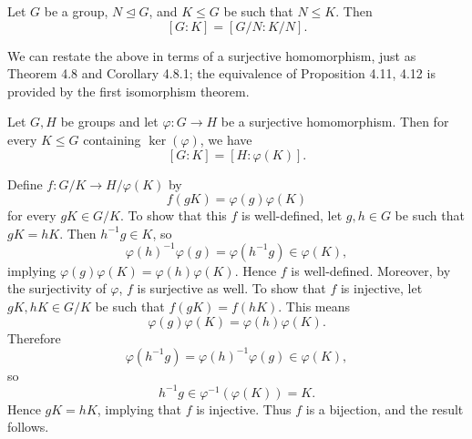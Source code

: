 \documentclass[pmath347]{subfiles}
\begin{document}
    \begin{prop}{}
        Let $G$ be a group, $N\trianglelefteq G$, and $K\leq G$ be such that $N\leq K$. Then
        \begin{equation*}
            \left[ G:K \right] = \left[ G /N:K /N \right] .
        \end{equation*}
    \end{prop}

    \noindent We can restate the above in terms of a surjective homomorphism, just as Theorem 4.8 and Corollary 4.8.1; the equivalence of Proposition 4.11, 4.12 is provided by the first isomorphism theorem.

    \begin{prop}{}
        Let $G,H$ be groups and let $\varphi:G\to H$ be a surjective homomorphism. Then for every $K\leq G$ containing $\ker\left( \varphi \right)$, we have
        \begin{equation*}
            \left[ G:K \right] = \left[ H:\varphi\left( K \right)  \right] .
        \end{equation*}
    \end{prop}

    \begin{prop}{}
        Define $f:G /K\to H /\varphi\left( K \right)$ by
        \begin{equation*}
            f\left( gK \right) = \varphi\left( g \right) \varphi\left( K \right) 
        \end{equation*}
        for every $gK\in G /K$. To show that this $f$ is well-defined, let $g,h\in G$ be such that $gK=hK$. Then $h^{-1} g \in K$, so
        \begin{equation*}
            \varphi\left( h \right) ^{-1} \varphi\left( g \right) = \varphi\left( h^{-1} g \right) \in \varphi\left( K \right) ,
        \end{equation*}
        implying $\varphi\left( g \right) \varphi\left( K \right) = \varphi\left( h \right) \varphi\left( K \right)$. Hence $f$ is well-defined. Moreover, by the surjectivity of $\varphi$, $f$ is surjective as well. To show that $f$ is injective, let $gK,hK\in G /K$ be such that $f\left( gK \right) = f\left( hK \right)$. This means
        \begin{equation*}
            \varphi\left( g \right) \varphi\left( K \right) = \varphi\left( h \right) \varphi\left( K \right) .
        \end{equation*}
        Therefore
        \begin{equation*}
            \varphi\left( h^{-1} g \right) = \varphi\left( h \right) ^{-1} \varphi\left( g \right) \in \varphi\left( K \right) ,
        \end{equation*}
        so
        \begin{equation*}
            h^{-1} g\in\varphi^{-1} \left( \varphi\left( K \right)  \right) = K.
        \end{equation*}
        Hence $gK=hK$, implying that $f$ is injective. Thus $f$ is a bijection, and the result follows.
    \end{prop}
\end{document}

